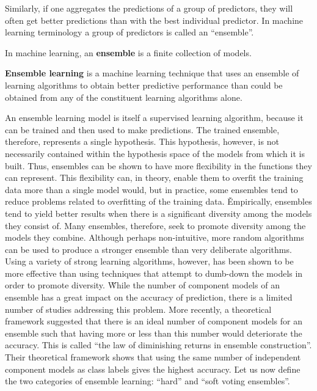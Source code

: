 Similarly, if one aggregates the predictions of a group of predictors, they will often get better predictions than
with the best individual predictor. In machine learning terminology a group of predictors is called an ``ensemble''.

\bd[Ensemble]
In machine learning, an \textbf{ensemble} is a finite collection of models.
\ed

\textbf{Ensemble learning} is a machine learning technique that uses an ensemble of learning algorithms to obtain better
predictive performance than could be obtained from any of the constituent learning algorithms alone.
\ed

An ensemble learning model is itself a supervised learning algorithm, because it can be trained and then used to
make predictions. The trained ensemble, therefore, represents a single hypothesis. This hypothesis, however, is not
necessarily contained within the hypothesis space of the models from which it is built. Thus, ensembles can be shown
to have more flexibility in the functions they can represent. This flexibility can, in theory, enable them to
overfit the training data more than a single model would, but in practice, some ensembles tend to reduce problems
related to overfitting of the training data. \v

Empirically, ensembles tend to yield better results when there is a significant diversity among the models they
consist of. Many ensembles, therefore, seek to promote diversity among the models they combine. Although perhaps
non-intuitive, more random algorithms can be used to produce a stronger ensemble than very deliberate algorithms.
Using a variety of strong learning algorithms, however, has been shown to be more effective than using techniques
that attempt to dumb-down the models in order to promote diversity. \v

While the number of component models of an ensemble has a great impact on the accuracy of prediction, there is a
limited number of studies addressing this problem. More recently, a theoretical framework suggested that there is an
ideal number of component models for an ensemble such that having more or less than this number  would deteriorate
the accuracy. This is called ``the law of diminishing returns in ensemble construction''. Their theoretical
framework shows that using the same number of independent component models as class labels gives the highest
accuracy. \v

Let us now define the two categories of ensemble learning: ``hard'' and ``soft voting ensembles''.

